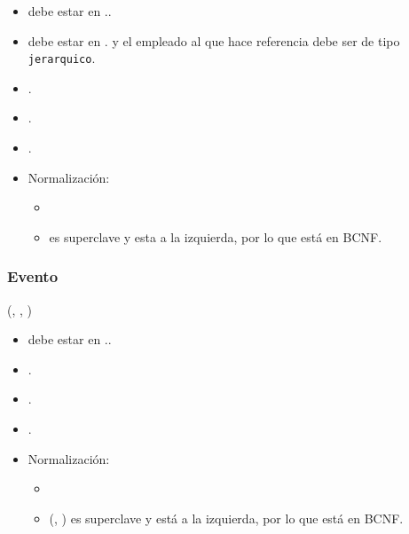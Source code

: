           \begin{itemize}
              \item {} debe estar en ..
              \item {} debe estar en .
                  y el empleado al que hace referencia debe ser de tipo 
                  \verb|jerarquico|.
              \item {}.
              \item {}.
              \item {}.
              \item Normalización:
                    \begin{itemize}
                        \item {}
                        \item {} es superclave y esta a la
                              izquierda, por lo que está en BCNF.
                    \end{itemize}
          \end{itemize}

\subsubsection{Evento}

    (, ,
        )

    \begin{itemize}
        \item {} debe estar en ..
        \item {}.
        \item {}.
        \item {}.

        \item Normalización:

            \begin{itemize}
                \item {}

                \item (, ) es superclave y está
                    a la izquierda, por lo que está en BCNF.
            \end{itemize}
    \end{itemize}

